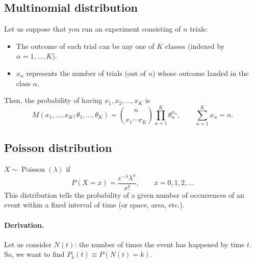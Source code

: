 \subsection{Multinomial distribution}
Let us suppose that you run an experiment consisting of $n$ trials:
\begin{itemize}
\item The outcome of each trial can be any one of $K$ classes (indexed by $\alpha = 1, \dots, K$).
\item $x_\alpha$ represents the number of trials (out of $n$) whose outcome landed in the class $\alpha$.
\end{itemize}
Then, the probability of having $x_1, x_2, \dots, x_K$ is
\[
M(x_1, \dots, x_K; \theta_1, \dots, \theta_K) = \binom{n}{x_1 \cdots x_K}\prod_{\alpha=1}^{K}\theta_\alpha^{x_\alpha},
\qquad
\sum_{\alpha=1}^{K} x_\alpha = n.
\]

\subsection{Poisson distribution}
$X \sim \operatorname{Poisson}(\lambda)$ if
\[
P(X = x) = \frac{e^{-\lambda}\lambda^{x}}{x!}, \qquad x = 0, 1, 2, \dots
\]
This distribution tells the probability of a given number of occurrences of an event within a fixed interval of time (or space, area, etc.).

\paragraph{Derivation.}
Let us consider $N(t)$: the number of times the event has happened by time $t$. So, we want to find $P_k(t) \equiv P(N(t) = k)$.

